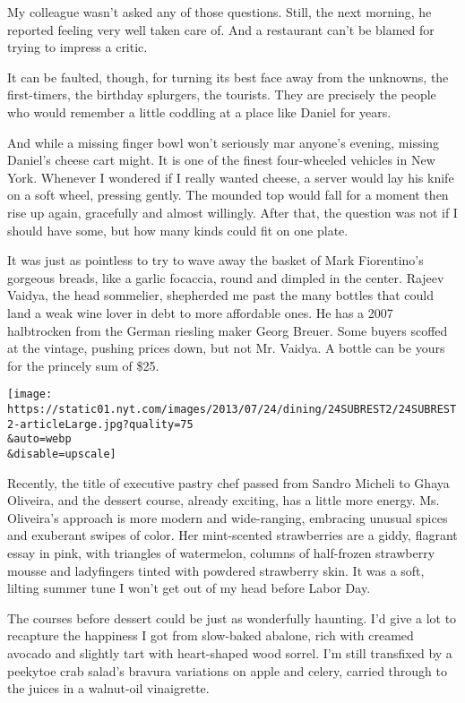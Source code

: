 My colleague wasn't asked any of those questions. Still, the next
morning, he reported feeling very well taken care of. And a restaurant
can't be blamed for trying to impress a critic.

It can be faulted, though, for turning its best face away from the
unknowns, the first-timers, the birthday splurgers, the tourists. They
are precisely the people who would remember a little coddling at a place
like Daniel for years.

And while a missing finger bowl won't seriously mar anyone's evening,
missing Daniel's cheese cart might. It is one of the finest four-wheeled
vehicles in New York. Whenever I wondered if I really wanted cheese, a
server would lay his knife on a soft wheel, pressing gently. The mounded
top would fall for a moment then rise up again, gracefully and almost
willingly. After that, the question was not if I should have some, but
how many kinds could fit on one plate.

It was just as pointless to try to wave away the basket of Mark
Fiorentino's gorgeous breads, like a garlic focaccia, round and dimpled
in the center. Rajeev Vaidya, the head sommelier, shepherded me past the
many bottles that could land a weak wine lover in debt to more
affordable ones. He has a 2007 halbtrocken from the German riesling
maker Georg Breuer. Some buyers scoffed at the vintage, pushing prices
down, but not Mr. Vaidya. A bottle can be yours for the princely sum of
\$25.

\texttt{[image: https://static01.nyt.com/images/2013/07/24/dining/24SUBREST2/24SUBREST2-articleLarge.jpg?quality=75\\\&auto=webp\\\&disable=upscale]}

Recently, the title of executive pastry chef passed from Sandro Micheli
to Ghaya Oliveira, and the dessert course, already exciting, has a
little more energy. Ms. Oliveira's approach is more modern and
wide-ranging, embracing unusual spices and exuberant swipes of color.
Her mint-scented strawberries are a giddy, flagrant essay in pink, with
triangles of watermelon, columns of half-frozen strawberry mousse and
ladyfingers tinted with powdered strawberry skin. It was a soft, lilting
summer tune I won't get out of my head before Labor Day.

The courses before dessert could be just as wonderfully haunting. I'd
give a lot to recapture the happiness I got from slow-baked abalone,
rich with creamed avocado and slightly tart with heart-shaped wood
sorrel. I'm still transfixed by a peekytoe crab salad's bravura
variations on apple and celery, carried through to the juices in a
walnut-oil vinaigrette.

